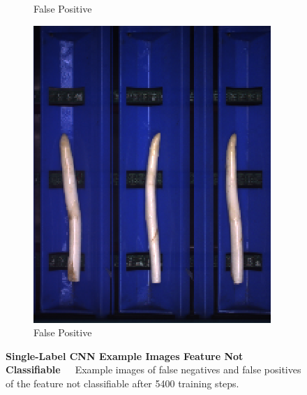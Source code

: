 \begin{figure}[h]
\begin{subfigure}{0.3\textwidth}
		\vspace{-5pt}
		\caption{False Positive}
	\end{subfigure}
	\begin{subfigure}{0.3\textwidth}
		\includegraphics[width=0.9\linewidth]{Figures/appendix/notclassifiable_falsepositive_03.png}
		\vspace{-5pt}
		\caption{False Positive}
	\end{subfigure}
    \caption[Single-Label CNN Feature Example Images Not Classifiable]{\textbf{Single-Label CNN Example Images Feature Not Classifiable}~~~Example images of false negatives and false positives of the feature not classifiable after 5400 training steps.}
	\vspace{-20pt}
    \label{fig:ExampleImagesNotClassifiable}
\end{figure}


